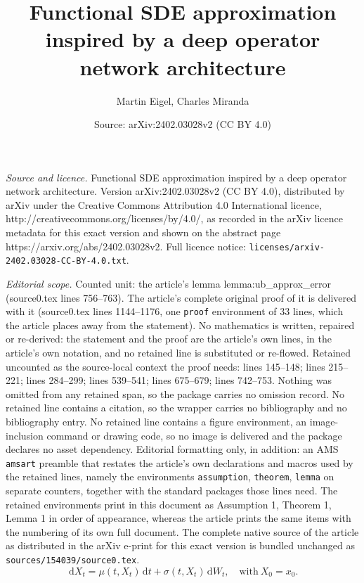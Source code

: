 \documentclass[10pt,a4paper]{amsart}
\title{Functional SDE approximation inspired by a deep operator network architecture}
\author{Martin Eigel, Charles Miranda}
\date{Source: arXiv:2402.03028v2 (CC BY 4.0)}
\newcommand{\dd}{\ensuremath{\,\mathrm d}}
\begin{document}
\maketitle

\noindent\emph{Source and licence.} Functional SDE approximation inspired by a deep operator network architecture. Version arXiv:2402.03028v2 (CC BY 4.0), distributed by arXiv under the Creative Commons Attribution 4.0 International licence, http://creativecommons.org/licenses/by/4.0/, as recorded in the arXiv licence metadata for this exact version and shown on the abstract page https://arxiv.org/abs/2402.03028v2. Full licence notice: \texttt{licenses/arxiv-2402.03028-CC-BY-4.0.txt}.\par\smallskip

\noindent\textit{Editorial scope.} Counted unit: the article's lemma lemma:ub\_approx\_error (source0.tex lines 756--763). The article's complete original proof of it is delivered with it (source0.tex lines 1144--1176, one \texttt{proof} environment of 33 lines, which the article places away from the statement). No mathematics is written, repaired or re-derived: the statement and the proof are the article's own lines, in the article's own notation, and no retained line is substituted or re-flowed.  Retained uncounted as the source-local context the proof needs: lines 145--148; lines 215--221; lines 284--299; lines 539--541; lines 675--679; lines 742--753.  Nothing was omitted from any retained span, so the package carries no omission record.  No retained line contains a citation, so the wrapper carries no bibliography and no bibliography entry.  No retained line contains a figure environment, an image-inclusion command or drawing code, so no image is delivered and the package declares no asset dependency.  Editorial formatting only, in addition: an AMS \texttt{amsart} preamble that restates the article's own declarations and macros used by the retained lines, namely the environments \texttt{assumption}, \texttt{theorem}, \texttt{lemma} on separate counters, together with the standard packages those lines need.  The retained environments print in this document as Assumption 1, Theorem 1, Lemma 1 in order of appearance, whereas the article prints the same items with the numbering of its own full document.  The complete native source of the article as distributed in the arXiv e-print for this exact version is bundled unchanged as \texttt{sources/154039/source0.tex}.
\begin{equation}
    \dd X_t = \mu(t, X_t)\dd t + \sigma(t, X_t)\dd W_t, \quad\text{with}~X_0=x_0.
    \label{eq:sde}
\end{equation}
\end{document}
